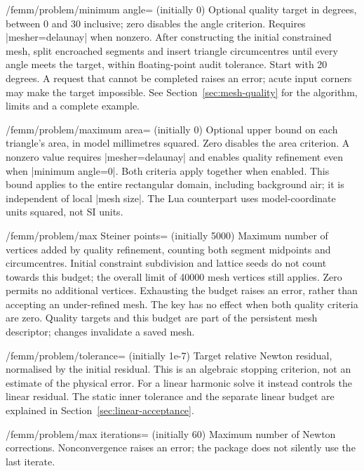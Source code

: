 \begin{key}{/femm/problem/minimum angle= (initially 0)}
Optional quality target in degrees, between 0 and 30 inclusive; zero disables
the angle criterion. Requires |mesher=delaunay| when nonzero. After constructing
the initial constrained mesh, split encroached segments and insert triangle
circumcentres until every angle meets the target, within floating-point audit
tolerance. Start with 20 degrees. A request that cannot be completed raises an
error; acute input corners may make the target impossible. See
Section~\ref{sec:mesh-quality} for the algorithm, limits and a complete example.
\end{key}
\begin{key}{/femm/problem/maximum area= (initially 0)}
Optional upper bound on each triangle's area, in model millimetres squared.
Zero disables the area criterion. A nonzero value requires |mesher=delaunay|
and enables quality refinement even when |minimum angle=0|. Both criteria
apply together when enabled. This bound applies to the entire rectangular
domain, including background air; it is independent of local |mesh size|.
The Lua counterpart uses model-coordinate units squared, not SI units.
\end{key}
\begin{key}{/femm/problem/max Steiner points= (initially 5000)}
Maximum number of vertices added by quality refinement, counting both segment
midpoints and circumcentres. Initial constraint subdivision and lattice seeds
do not count towards this budget; the overall limit of 40000 mesh vertices
still applies. Zero permits no additional vertices. Exhausting the budget
raises an error, rather than accepting an under-refined mesh. The key has no
effect when both quality criteria are zero. Quality targets and this budget
are part of the persistent mesh descriptor; changes invalidate a saved mesh.
\end{key}
\begin{key}{/femm/problem/tolerance= (initially 1e-7)}
Target relative Newton residual, normalised by the initial residual. This
is an algebraic stopping criterion, not an estimate of the physical error.
For a linear harmonic solve it instead controls the linear residual. The static
inner tolerance and the separate linear budget are explained in
Section~\ref{sec:linear-acceptance}.
\end{key}
\begin{key}{/femm/problem/max iterations= (initially 60)}
Maximum number of Newton corrections. Nonconvergence raises an error;
the package does not silently use the last iterate.
\end{key}

